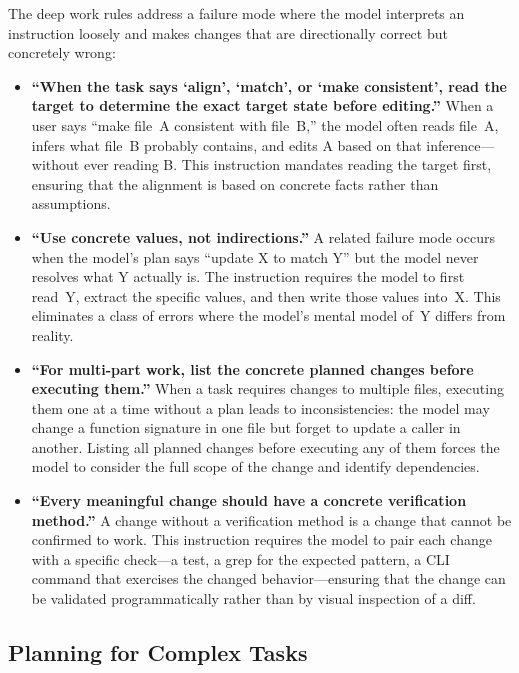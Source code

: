 \documentclass{article}
\begin{document}
\noindent The deep work rules address a failure mode where the model
interprets an instruction loosely and makes changes that are
directionally correct but concretely wrong:

\begin{itemize}[nosep]
\item \textbf{``When the task says `align', `match', or `make
  consistent', read the target to determine the exact target state
  before editing.''}  When a user says ``make file~A consistent with
  file~B,'' the model often reads file~A, infers what file~B probably
  contains, and edits A based on that inference---without ever reading
  B\@.  This instruction mandates reading the target first, ensuring
  that the alignment is based on concrete facts rather than
  assumptions.

\item \textbf{``Use concrete values, not indirections.''}  A related
  failure mode occurs when the model's plan says ``update X to match
  Y'' but the model never resolves what Y actually is.  The
  instruction requires the model to first read~Y, extract the
  specific values, and then write those values into~X\@.  This
  eliminates a class of errors where the model's mental model of~Y
  differs from reality.

\item \textbf{``For multi-part work, list the concrete planned changes
  before executing them.''}  When a task requires changes to multiple
  files, executing them one at a time without a plan leads to
  inconsistencies: the model may change a function signature in one
  file but forget to update a caller in another.  Listing all planned
  changes before executing any of them forces the model to consider
  the full scope of the change and identify dependencies.

\item \textbf{``Every meaningful change should have a concrete
  verification method.''}  A change without a verification method is a
  change that cannot be confirmed to work.  This instruction requires
  the model to pair each change with a specific check---a test, a grep
  for the expected pattern, a CLI command that exercises the changed
  behavior---ensuring that the change can be validated
  programmatically rather than by visual inspection of a diff.
\end{itemize}

\subsection{Planning for Complex Tasks}
\end{document}
